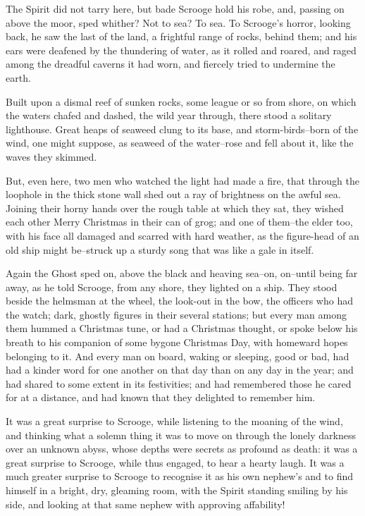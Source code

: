The Spirit did not tarry here, but bade Scrooge hold his robe, and,
passing on above the moor, sped whither? Not to sea? To sea. To
Scrooge's horror, looking back, he saw the last of the land, a frightful
range of rocks, behind them; and his ears were deafened by the
thundering of water, as it rolled and roared, and raged among the
dreadful caverns it had worn, and fiercely tried to undermine the earth.

Built upon a dismal reef of sunken rocks, some league or so from shore,
on which the waters chafed and dashed, the wild year through, there
stood a solitary lighthouse. Great heaps of seaweed clung to its base,
and storm-birds--born of the wind, one might suppose, as seaweed of the
water--rose and fell about it, like the waves they skimmed.

But, even here, two men who watched the light had made a fire, that
through the loophole in the thick stone wall shed out a ray of
brightness on the awful sea. Joining their horny hands over the rough
table at which they sat, they wished each other Merry Christmas in their
can of grog; and one of them--the elder too, with his face all damaged
and scarred with hard weather, as the figure-head of an old ship might
be--struck up a sturdy song that was like a gale in itself.

Again the Ghost sped on, above the black and heaving sea--on, on--until
being far away, as he told Scrooge, from any shore, they lighted on a
ship. They stood beside the helmsman at the wheel, the look-out in the
bow, the officers who had the watch; dark, ghostly figures in their
several stations; but every man among them hummed a Christmas tune, or
had a Christmas thought, or spoke below his breath to his companion of
some bygone Christmas Day, with homeward hopes belonging to it. And
every man on board, waking or sleeping, good or bad, had had a kinder
word for one another on that day than on any day in the year; and had
shared to some extent in its festivities; and had remembered those he
cared for at a distance, and had known that they delighted to remember
him.

It was a great surprise to Scrooge, while listening to the moaning of
the wind, and thinking what a solemn thing it was to move on through the
lonely darkness over an unknown abyss, whose depths were secrets as
profound as death: it was a great surprise to Scrooge, while thus
engaged, to hear a hearty laugh. It was a much greater surprise to
Scrooge to recognise it as his own nephew's and to find himself in a
bright, dry, gleaming room, with the Spirit standing smiling by his
side, and looking at that same nephew with approving affability!

